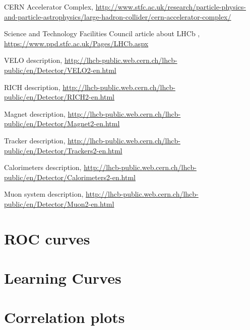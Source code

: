 \documentclass[english]{uzhpub}
\begin{document}
\begin{thebibliography}{100}

   CERN Accelerator Complex,
  \url{http://www.stfc.ac.uk/research/particle-physics-and-particle-astrophysics/large-hadron-collider/cern-accelerator-complex/}

   Science and Technology Facilities Council article about LHCb ,
  \url{https://www.ppd.stfc.ac.uk/Pages/LHCb.aspx}

   VELO description,
  \url{http://lhcb-public.web.cern.ch/lhcb-public/en/Detector/VELO2-en.html}

   RICH description,
  \url{http://lhcb-public.web.cern.ch/lhcb-public/en/Detector/RICH2-en.html}

   Magnet description,
  \url{http://lhcb-public.web.cern.ch/lhcb-public/en/Detector/Magnet2-en.html}

   Tracker description,
  \url{http://lhcb-public.web.cern.ch/lhcb-public/en/Detector/Trackers2-en.html}

   Calorimeters description,
  \url{http://lhcb-public.web.cern.ch/lhcb-public/en/Detector/Calorimeters2-en.html}

   Muon system description,
  \url{http://lhcb-public.web.cern.ch/lhcb-public/en/Detector/Muon2-en.html}

\end{thebibliography}

\begin{appendix}
  \section{ROC curves}
  \label{app:roc}

  \section{Learning Curves}
  \label{app:lc}

  \section{Correlation plots}
  \label{app:corr}



\end{appendix}
\end{document}
